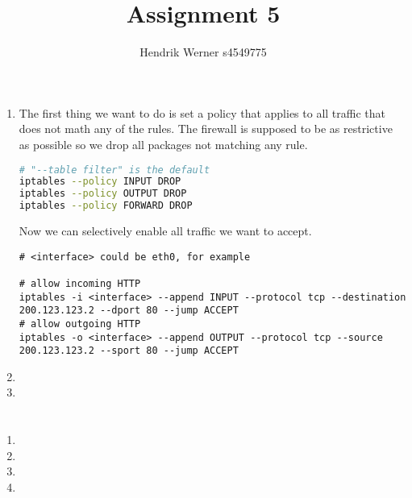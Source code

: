 \documentclass[12pt, a4paper]{article}
\title{Assignment 5}
\author{Hendrik Werner s4549775}
\begin{document}
\maketitle

\section{} %
\begin{enumerate}[a]
	\item %
	The first thing we want to do is set a policy that applies to all traffic that does not math any of the rules. The firewall is supposed to be as restrictive as possible so we drop all packages not matching any rule.

	\begin{lstlisting}[language=bash]
# "--table filter" is the default
iptables --policy INPUT DROP
iptables --policy OUTPUT DROP
iptables --policy FORWARD DROP
	\end{lstlisting}

	Now we can selectively enable all traffic we want to accept.

	\begin{lstlisting}
# <interface> could be eth0, for example

# allow incoming HTTP
iptables -i <interface> --append INPUT --protocol tcp --destination 200.123.123.2 --dport 80 --jump ACCEPT
# allow outgoing HTTP
iptables -o <interface> --append OUTPUT --protocol tcp --source 200.123.123.2 --sport 80 --jump ACCEPT
	\end{lstlisting}
	\item %
	\item %
\end{enumerate}

\section{} %

\section{} %
\begin{enumerate}[a]
	\item %
	\item %
	\item %
	\item %
\end{enumerate}
\end{document}
